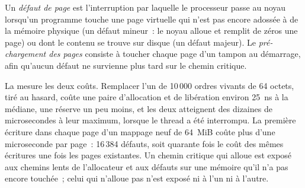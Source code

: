 \begin{definition}\label{def:ll:cpp-for-latency-i-memory:fault}
Un \emph{défaut de page} est l'interruption par laquelle le processeur passe au noyau lorsqu'un programme touche une page virtuelle qui
n'est pas encore adossée à de la mémoire physique (un défaut mineur~: le noyau alloue et remplit de zéros une page) ou dont le contenu se trouve sur disque
(un défaut majeur). Le \emph{pré-chargement des pages} consiste à toucher chaque page d'un tampon au démarrage, afin qu'aucun
défaut ne survienne plus tard sur le chemin critique.
\end{definition}

La  mesure les deux coûts. Remplacer l'un de 10\,000 ordres vivants de 64 octets, tiré au hasard,
coûte une paire d'allocation et de libération environ \qty{25}{\nano\second} à la médiane, une réserve un peu moins, et les deux atteignent des dizaines de
microsecondes à leur maximum, lorsque le thread a été interrompu. La première écriture dans chaque page d'un mappage neuf de 64~MiB
coûte plus d'une microseconde par page~: 16\,384 défauts, soit quarante fois le coût des mêmes écritures une fois les pages existantes. Un chemin critique
qui alloue est exposé aux chemins lents de l'allocateur et aux défauts sur une mémoire qu'il n'a pas encore touchée~; celui qui n'alloue pas
n'est exposé ni à l'un ni à l'autre.

